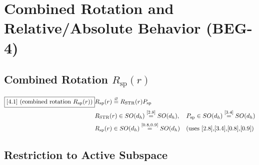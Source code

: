 \documentclass[11pt]{article}
\newcommand{\eqdef}{\overset{\varnothing}{=}}
\newcommand{\eqref}[1]{\overset{[#1]}{=}}
\begin{document}
\section{Combined Rotation and Relative/Absolute Behavior (BEG-4)}

\subsection{Combined Rotation $R_{\mathrm{sp}}(r)$}

\begin{align}
\boxed{[4.1] \text{ (combined rotation }R_{\mathrm{sp}}(r)\text{)}}
&R_{\mathrm{sp}}(r)
\eqdef
R_{\mathrm{STR}}(r)
P_{\mathrm{sp}} \notag\\
&R_{\mathrm{STR}}(r)
\in
SO(d_h)
\eqref{2.8}
SO(d_h),
\quad
P_{\mathrm{sp}}
\in
SO(d_h)
\eqref{3.4}
SO(d_h) \notag\\
&R_{\mathrm{sp}}(r)
\in
SO(d_h)
\eqref{0.8,0.9}
SO(d_h)
\quad(\text{uses [2.8],[3.4],[0.8],[0.9]})
\end{align}

\subsection{Restriction to Active Subspace}
\end{document}
